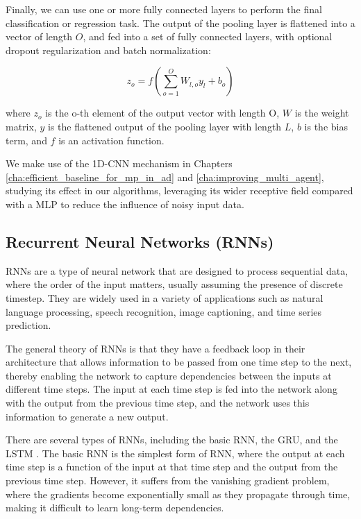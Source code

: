 Finally, we can use one or more fully connected layers to perform the final classification or regression task. The output of the pooling layer is flattened into a vector of length $O$, and fed into a set of fully connected layers, with optional dropout regularization and batch normalization:

\begin{equation}
	z_o = f(\sum_{o=1}^O W_{l,o} y_l + b_o)
\end{equation}

where $z_{o}$ is the o-th element of the output vector with length O, $W$ is the weight matrix, $y$ is the flattened output of the pooling layer with length $L$, $b$ is the bias term, and $f$ is an activation function. 

We make use of the 1D-\ac{CNN} mechanism in Chapters \ref{cha:efficient_baseline_for_mp_in_ad} and \ref{cha:improving_multi_agent}, studying its effect in our algorithms, leveraging its wider receptive field compared with a \ac{MLP} to reduce the influence of noisy input data. 

\subsection{Recurrent Neural Networks (RNNs)}
\label{subsec:3_rnns}

\acfp{RNN} are a type of neural network that are designed to process sequential data, where the order of the input matters, usually assuming the presence of discrete timestep. They are widely used in a variety of applications such as natural language processing, speech recognition, image captioning, and time series prediction.

The general theory of \acp{RNN} is that they have a feedback loop in their architecture that allows information to be passed from one time step to the next, thereby enabling the network to capture dependencies between the inputs at different time steps. The input at each time step is fed into the network along with the output from the previous time step, and the network uses this information to generate a new output.

There are several types of \acp{RNN}, including the basic \ac{RNN}, the \ac{GRU}, and the \acf{LSTM} \cite{hochreiter1997long}. The basic \ac{RNN} is the simplest form of \ac{RNN}, where the output at each time step is a function of the input at that time step and the output from the previous time step. However, it suffers from the vanishing gradient problem, where the gradients become exponentially small as they propagate through time, making it difficult to learn long-term dependencies.

